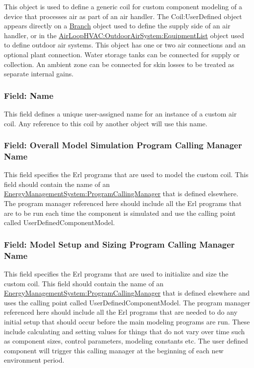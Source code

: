 This object is used to define a generic coil for custom component modeling of a device that processes air as part of an air handler. The Coil:UserDefined object appears directly on a \hyperref[branch]{Branch} object used to define the supply side of an air handler, or in the \hyperref[airloophvacoutdoorairsystemequipmentlist]{AirLoopHVAC:OutdoorAirSystem:EquipmentList} object used to define outdoor air systems. This object has one or two air connections and an optional plant connection. Water storage tanks can be connected for supply or collection. An ambient zone can be connected for skin losses to be treated as separate internal gains.

\subsubsection{Field: Name}\label{field-name-2-041}

This field defines a unique user-assigned name for an instance of a custom air coil. Any reference to this coil by another object will use this name.

\subsubsection{Field: Overall Model Simulation Program Calling Manager Name}\label{field-overall-model-simulation-program-calling-manager-name-2}

This field specifies the Erl programs that are used to model the custom coil. This field should contain the name of an \hyperref[energymanagementsystemprogramcallingmanager]{EnergyManagementSystem:ProgramCallingManager} that is defined elsewhere. The program manager referenced here should include all the Erl programs that are to be run each time the component is simulated and use the calling point called UserDefinedComponentModel.

\subsubsection{Field: Model Setup and Sizing Program Calling Manager Name}\label{field-model-setup-and-sizing-program-calling-manager-name-2}

This field specifies the Erl programs that are used to initialize and size the custom coil. This field should contain the name of an \hyperref[energymanagementsystemprogramcallingmanager]{EnergyManagementSystem:ProgramCallingManager} that is defined elsewhere and uses the calling point called UserDefinedComponentModel. The program manager referenced here should include all the Erl programs that are needed to do any initial setup that should occur before the main modeling programs are run. These include calculating and setting values for things that do not vary over time such as component sizes, control parameters, modeling constants etc. The user defined component will trigger this calling manager at the beginning of each new environment period.

